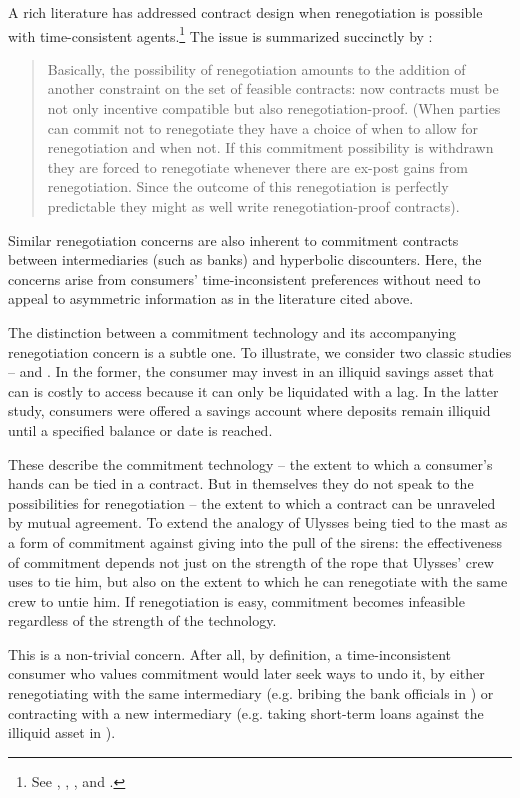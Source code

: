 \documentclass[11pt,english]{article}
\theoremstyle{plain}
\theoremstyle{definition}
\begin{document}
A rich literature has addressed contract design when renegotiation is possible with time-consistent agents.\footnote{See \citet{hart1988}, \citet{dewatripont1989}, \citet{bolton1990}, and \citet{rubinstein1992}.} The issue is  summarized succinctly by \citet[p303]{bolton1990}:
\begin{quote}
Basically, the possibility of renegotiation amounts to the addition of another constraint on the set of feasible contracts: now contracts must be not only incentive compatible but also renegotiation-proof. (When parties can commit not to renegotiate they have a choice of when to allow for renegotiation and when not. If this commitment possibility is withdrawn they are forced to renegotiate whenever there are ex-post gains from renegotiation. Since the outcome of this renegotiation is perfectly predictable they might as well write renegotiation-proof
contracts).
\end{quote}

Similar renegotiation concerns are  also inherent to commitment contracts between intermediaries (such as banks) and hyperbolic discounters. Here, the concerns arise from consumers' time-inconsistent preferences without need to appeal to asymmetric information as in the literature cited above. 

The distinction between a commitment technology and its accompanying renegotiation concern is a subtle one. To illustrate, we consider two classic studies --  \citet{laibson1997} and \citet{ashraf2006}. In the former, the consumer may invest in an illiquid savings asset that can is costly to access because it can only be liquidated with a lag. In the latter study, consumers were offered a savings account where deposits remain illiquid until a specified balance or date is reached.

These describe the commitment technology -- the extent to which a consumer's hands can be tied in a contract. But in themselves they do not speak to the possibilities for renegotiation -- the extent to which a contract can be unraveled by mutual agreement. To extend the \citet{ashraf2006} analogy of Ulysses being tied to the mast as a form of commitment against giving into the pull of the sirens: the effectiveness of commitment depends not just on the strength of the rope that Ulysses' crew uses to tie him, but also on the extent to which he can renegotiate with the same crew to untie him. If renegotiation is easy, commitment becomes infeasible regardless of the strength of the technology.

This is a non-trivial concern. After all, by definition, a time-inconsistent consumer who values commitment would later seek ways to undo it, by either renegotiating with the same intermediary (e.g. bribing the bank officials in \citealp{ashraf2006}) or contracting with a new intermediary (e.g. taking short-term loans against the illiquid asset in \citealp{laibson1997}).
\end{document}
